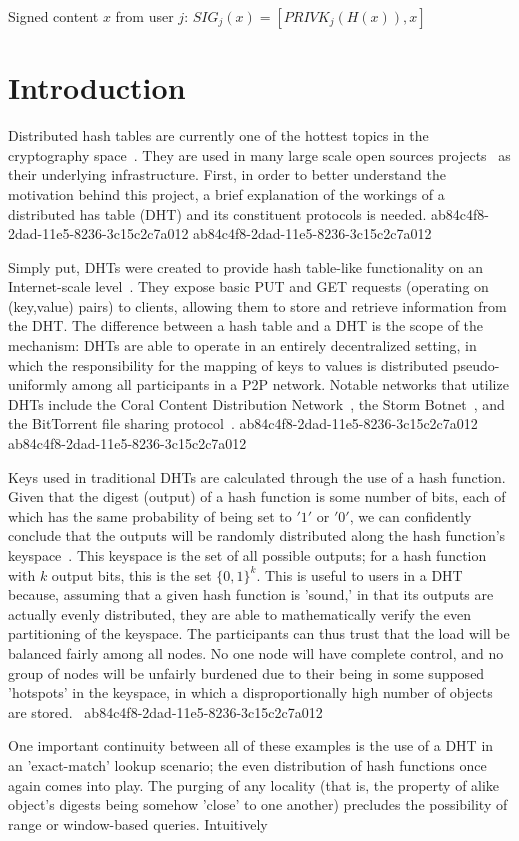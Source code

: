 \documentclass[12pt]{article}
\begin{document}
Signed content $x$ from user $j$: $SIG_j(x) = \left[ PRIVK_j( H(x) ), x \right]$

\section{Introduction}
\par Distributed hash tables are currently one of the hottest topics in the cryptography space~\cite{Stoica:2001dj,Rowstron:2001ea,Ratnasamy:2001wn}. They are used in many large scale open sources projects~\cite{Freitas:2013tb,Xu:2010vs,Perfitt:2010fh} as their underlying infrastructure. First, in order to better understand the motivation behind this project, a brief explanation of the workings of a distributed has table (DHT) and its constituent protocols is needed.
ab84c4f8-2dad-11e5-8236-3c15c2c7a012
ab84c4f8-2dad-11e5-8236-3c15c2c7a012\par Simply put, DHTs were created to provide hash table-like functionality on an Internet-scale level~\cite{Ratnasamy:2001wn}. They expose basic PUT and GET requests (operating on (key,value) pairs) to clients, allowing them to store and retrieve information from the DHT. The difference between a hash table and a DHT is the scope of the mechanism: DHTs are able to operate in an entirely decentralized setting, in which the responsibility for the mapping of keys to values is distributed pseudo-uniformly among all participants in a P2P network. Notable networks that utilize DHTs include the Coral Content Distribution Network~\cite{Freedman:2004vb}, the Storm Botnet~\cite{Holz:2008uk}, and the BitTorrent file sharing protocol~\cite{Cohen:y1_8mBnw}.
ab84c4f8-2dad-11e5-8236-3c15c2c7a012
ab84c4f8-2dad-11e5-8236-3c15c2c7a012\par Keys used in traditional DHTs are calculated through the use of a hash function. Given that the digest (output) of a hash function is some number of bits, each of which has the same probability of being set to $'1'$ or $'0'$, we can confidently conclude that the outputs will be randomly distributed along the hash function's keyspace~. This keyspace is the set of all possible outputs; for a hash function with $k$ output bits, this is the set $\{0,1\}^k$. This is useful to users in a DHT because, assuming that a given hash function is 'sound,' in that its outputs are actually evenly distributed, they are able to mathematically verify the even partitioning of the keyspace. The participants can thus trust that the load will be balanced fairly among all nodes. No one node will have complete control, and no group of nodes will be unfairly burdened due to their being in some supposed 'hotspots' in the keyspace, in which a disproportionally high number of objects are stored.~
ab84c4f8-2dad-11e5-8236-3c15c2c7a012
\par One important continuity between all of these examples is the use of a DHT in an 'exact-match' lookup scenario; the even distribution of hash functions once again comes into play. The purging of any locality (that is, the property of alike object's digests being somehow 'close' to one another) precludes the possibility of range or window-based queries. Intuitively
\end{document}

